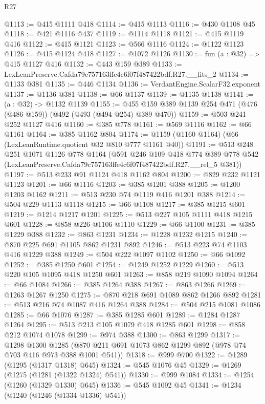 \begin{lexlean}{R27}
\begin{coremodule}
@1113 := @415 @1111 @418
@1114 := @415 @1113
@1116 := @430 @1108 @45
@1118 := @421 @1116 @437
@1119 := @1114 @1118
@1121 := @415 @1119 @416
@1122 := @415 @1121
@1123 := @566 @1116
@1124 := @1122 @1123
@1126 := @415 @1124 @418
@1127 := @1072 @1126
@1130 := fun (a : @32) => @415 @1127 @416
@1132 := @443 @159 @389
@1133 := LexLeanPreserve.Cafda79c757163ffe4c6f07f487422bdf.R27.__fits_2
@1134 := @1133 @381
@1135 := @446 @1134
@1136 := VerdantEngine.ScalarF32.exponent
@1137 := @1136 @381
@1138 := @66 @1137
@1139 := @1135 @1138
@1141 := (a : @32) -> @1132 @1139
@1155 := @455 @159 @389 @1139 @254 @471 (@476 (@486 @159)) (@492 (@493 (@494 @254) @389 @470))
@1159 := @503 @241 @252 @1127 @416
@1160 := @385 @778
@1161 := @569 @1116
@1162 := @66 @1161
@1164 := @385 @1162 @804
@1174 := @1159 (@1160 @1164) (@66 (LexLeanRuntime.quotient @32 @810 @777 @1161 @40))
@1191 := @513
    @248
    @251
    @1071
    @1126
    @778
    @1164
    (@591
      @246
      @109
      @418
      @774
      @389
      @778
      @542
      (LexLeanPreserve.Cafda79c757163ffe4c6f07f487422bdf.R27.__rel_5 @381))
@1197 := @513 @233 @91 @1124 @418 @1162 @804
@1200 := @829 @232 @1121 @1123
@1201 := @66 @1116
@1203 := @385 @1201 @388
@1205 := @1200 @1203 @1162
@1211 := @513 @230 @74 @1119 @416 @1201 @388
@1214 := @504 @229 @1113 @1118
@1215 := @66 @1108
@1217 := @385 @1215 @601
@1219 := @1214 @1217 @1201
@1225 := @513 @227 @105 @1111 @418 @1215 @601
@1228 := @858 @226 @1106 @1110
@1229 := @66 @1100
@1231 := @385 @1229 @388
@1232 := @863 @1231
@1234 := @1228 @1232 @1215
@1240 := @870 @225 @691 @1105 @862 @1231 @892
@1246 := @513 @223 @74 @1103 @416 @1229 @388
@1249 := @504 @222 @1097 @1102
@1250 := @66 @1092
@1252 := @385 @1250 @601
@1254 := @1249 @1252 @1229
@1260 := @513 @220 @105 @1095 @418 @1250 @601
@1263 := @858 @219 @1090 @1094
@1264 := @66 @1084
@1266 := @385 @1264 @388
@1267 := @863 @1266
@1269 := @1263 @1267 @1250
@1275 := @870 @218 @691 @1089 @862 @1266 @892
@1281 := @513 @216 @74 @1087 @416 @1264 @388
@1284 := @504 @215 @1081 @1086
@1285 := @66 @1076
@1287 := @385 @1285 @601
@1289 := @1284 @1287 @1264
@1295 := @513 @213 @105 @1079 @418 @1285 @601
@1298 := @858 @212 @1074 @1078
@1299 := @974 @388
@1300 := @863 @1299
@1317 := @1298
    @1300
    @1285
    (@870 @211 @691 @1073 @862 @1299 @892 (@978 @74 @703 @416 @973 @388 @1001 @541))
@1318 := @999 @700
@1322 := @1289 (@1295 (@1317 @1318) @645)
@1324 := @545 @1076 @45
@1329 := @1269 (@1275 (@1281 (@1322 @1324) @541))
@1330 := @999 @1084
@1334 := @1254 (@1260 (@1329 @1330) @645)
@1336 := @545 @1092 @45
@1341 := @1234 (@1240 (@1246 (@1334 @1336) @541))

\end{coremodule}
\end{lexlean}
